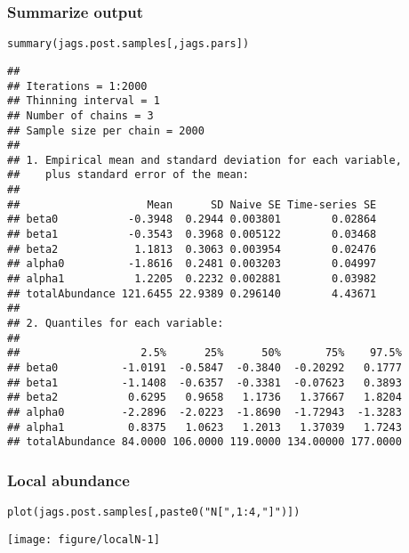 \documentclass[color=usenames,dvipsnames]{beamer}\usepackage[]{graphicx}\usepackage[]{color}
\makeatletter
\newcommand{\hlnum}[1]{\textcolor[rgb]{0.69,0.494,0}{#1}}%
\newcommand{\hlstr}[1]{\textcolor[rgb]{0.749,0.012,0.012}{#1}}%
\newcommand{\hlopt}[1]{\textcolor[rgb]{0,0,0}{#1}}%
\newcommand{\hlstd}[1]{\textcolor[rgb]{0,0,0}{#1}}%
\newcommand{\hlkwd}[1]{\textcolor[rgb]{0.004,0.004,0.506}{#1}}%
\newenvironment{kframe}{%
 \def\at@end@of@kframe{}%
 \ifinner\ifhmode%
  \def\at@end@of@kframe{\end{minipage}}%
  \begin{minipage}{\columnwidth}%
 \fi\fi%
 \def\FrameCommand##1{\hskip\@totalleftmargin \hskip-\fboxsep
 \colorbox{shadecolor}{##1}\hskip-\fboxsep
     \hskip-\linewidth \hskip-\@totalleftmargin \hskip\columnwidth}%
 \MakeFramed {\advance\hsize-\width
   \@totalleftmargin\z@ \linewidth\hsize
   \@setminipage}}%
 {\par\unskip\endMakeFramed%
 \at@end@of@kframe}
\newenvironment{knitrout}{}{} %
\makeatother
\begin{document}
\begin{frame}[fragile]
  \frametitle{Summarize output}
\begin{knitrout}\tiny
{}\color{fgcolor}\begin{kframe}
\begin{alltt}
\hlkwd{summary}\hlstd{(jags.post.samples[,jags.pars])}
\end{alltt}
\begin{verbatim}
## 
## Iterations = 1:2000
## Thinning interval = 1 
## Number of chains = 3 
## Sample size per chain = 2000 
## 
## 1. Empirical mean and standard deviation for each variable,
##    plus standard error of the mean:
## 
##                    Mean      SD Naive SE Time-series SE
## beta0           -0.3948  0.2944 0.003801        0.02864
## beta1           -0.3543  0.3968 0.005122        0.03468
## beta2            1.1813  0.3063 0.003954        0.02476
## alpha0          -1.8616  0.2481 0.003203        0.04997
## alpha1           1.2205  0.2232 0.002881        0.03982
## totalAbundance 121.6455 22.9389 0.296140        4.43671
## 
## 2. Quantiles for each variable:
## 
##                   2.5%      25%      50%       75%    97.5%
## beta0          -1.0191  -0.5847  -0.3840  -0.20292   0.1777
## beta1          -1.1408  -0.6357  -0.3381  -0.07623   0.3893
## beta2           0.6295   0.9658   1.1736   1.37667   1.8204
## alpha0         -2.2896  -2.0223  -1.8690  -1.72943  -1.3283
## alpha1          0.8375   1.0623   1.2013   1.37039   1.7243
## totalAbundance 84.0000 106.0000 119.0000 134.00000 177.0000
\end{verbatim}
\end{kframe}
\end{knitrout}
\end{frame}


\begin{frame}[fragile]
  \frametitle{Local abundance}
\begin{knitrout}\scriptsize
{}\color{fgcolor}\begin{kframe}
\begin{alltt}
\hlkwd{plot}\hlstd{(jags.post.samples[,}\hlkwd{paste0}\hlstd{(}\hlstr{"N["}\hlstd{,} \hlnum{1}\hlopt{:}\hlnum{4}\hlstd{,} \hlstr{"]"}\hlstd{)])}
\end{alltt}
\end{kframe}

{\centering \texttt{[image: figure/localN-1]} 

}



\end{knitrout}
\end{frame}
\end{document}
